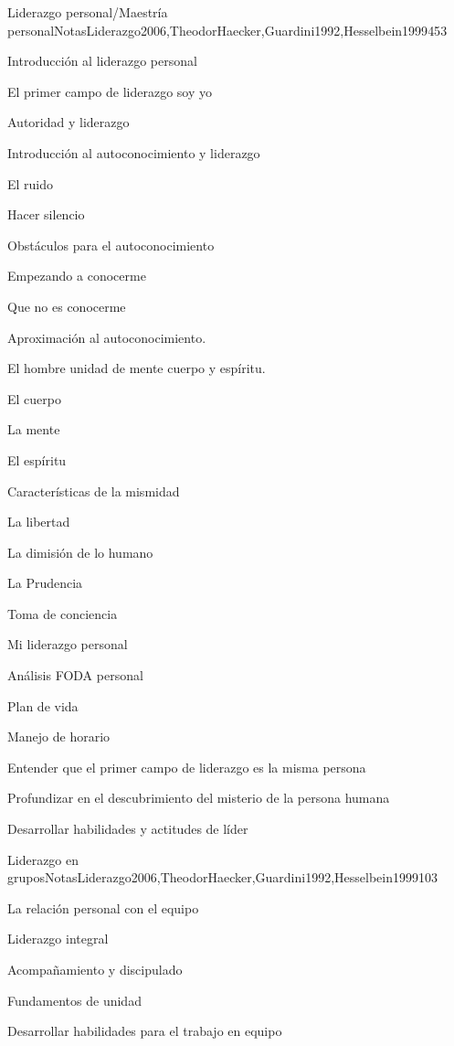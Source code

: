 \begin{syllabus}
\begin{unit}{Liderazgo personal/Maestría personal}{NotasLiderazgo2006,TheodorHaecker,Guardini1992,Hesselbein1999}{45}{3}
\begin{topics}
	\item Introducción al liderazgo personal
	\item El primer campo de liderazgo soy yo
	\item Autoridad y liderazgo
	\item Introducción al autoconocimiento y liderazgo
	\item El ruido
	\item Hacer silencio
	\item Obstáculos para el autoconocimiento
	\item Empezando a conocerme
	\item Que no es conocerme
	\item Aproximación al autoconocimiento.
	\item El hombre unidad de mente cuerpo y espíritu.
	\item El cuerpo
	\item La mente
	\item El espíritu
	\item Características de la mismidad
	\item La libertad
	\item La dimisión de lo humano
	\item La Prudencia
	\item Toma de conciencia
	\item Mi liderazgo personal
	\item Análisis FODA personal
	\item Plan de vida
	\item Manejo de horario
\end{topics}
\begin{unitgoals}
	\item Entender que el primer campo de liderazgo es la misma persona
	\item Profundizar en el descubrimiento del misterio de la persona humana
	\item Desarrollar habilidades y actitudes de líder
\end{unitgoals}
\end{unit}

\begin{unit}{Liderazgo en grupos}{NotasLiderazgo2006,TheodorHaecker,Guardini1992,Hesselbein1999}{10}{3}
\begin{topics}
	\item La relación personal con el equipo
	\item Liderazgo integral
	\item Acompañamiento y discipulado
	\item Fundamentos de unidad
\end{topics}
\begin{unitgoals}
	\item Desarrollar habilidades para el trabajo en equipo
\end{unitgoals}
\end{unit}




\end{syllabus}
